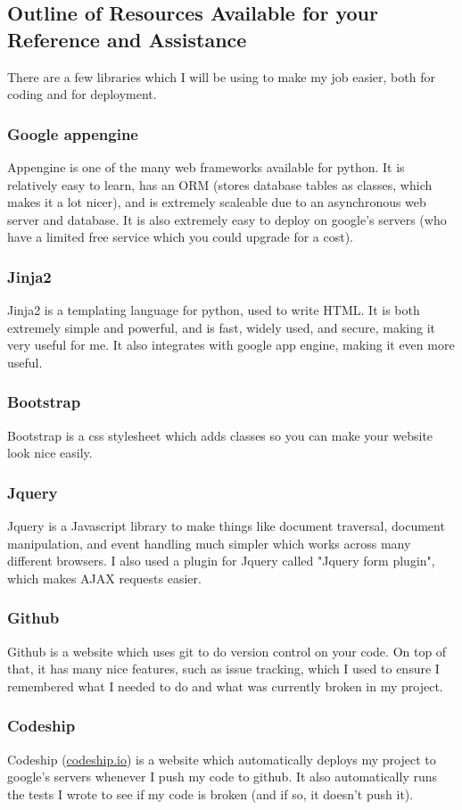 \subsection{Outline of Resources Available for your Reference and Assistance}
There are a few libraries which I will be using to make my job easier, both for coding and for deployment.

\subsubsection{Google appengine}
Appengine is one of the many web frameworks available for python. It is relatively easy to learn, has an ORM (stores database tables as classes, which makes it a lot nicer), and is extremely scaleable due to an asynchronous web server and database. It is also extremely easy to deploy on google's servers (who have a limited free service which you could upgrade for a cost).
	
\subsubsection{Jinja2}
Jinja2 is a templating language for python, used to write HTML. It is both extremely simple and powerful, and is fast, widely used, and secure, making it very useful for me. It also integrates with google app engine, making it even more useful.

\subsubsection{Bootstrap}
Bootstrap is a css stylesheet which adds classes so you can make your website look nice easily.

\subsubsection{Jquery}
Jquery is a Javascript library to make things like document traversal, document manipulation, and event handling much simpler which works across many different browsers. I also used a plugin for Jquery called "Jquery form plugin", which makes AJAX requests easier.

\subsubsection{Github}
Github is a website which uses git to do version control on your code. On top of that, it has many nice features, such as issue tracking, which I used to ensure I remembered what I needed to do and what was currently broken in my project.

\subsubsection{Codeship}
Codeship (\url{codeship.io}) is a website which automatically deploys my project to google's servers whenever I push my code to github. It also automatically runs the tests I wrote to see if my code is broken (and if so, it doesn't push it).
